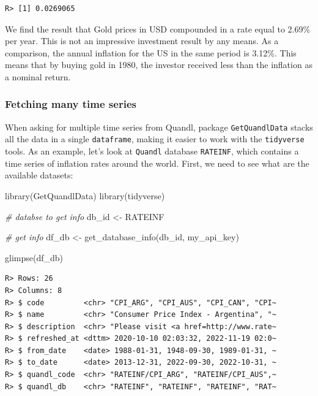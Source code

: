 \documentclass[
  12pt,
]{book}
\newenvironment{Shaded}{\begin{snugshade}}{\end{snugshade}}
\newcommand{\CommentTok}[1]{\textcolor[rgb]{0.37,0.37,0.37}{\textit{#1}}}
\newcommand{\FunctionTok}[1]{\textcolor[rgb]{0,0,0}{#1}}
\newcommand{\NormalTok}[1]{#1}
\newcommand{\OtherTok}[1]{\textcolor[rgb]{0.37,0.37,0.37}{#1}}
\newcommand{\StringTok}[1]{\textcolor[rgb]{0.5,0.5,0.5}{#1}}
\begin{document}
\begin{verbatim}
R> [1] 0.0269065
\end{verbatim}

We find the result that Gold prices in USD compounded in a rate equal to 2.69\% per year. This is not an impressive investment result by any means. As a comparison, the annual inflation for the US in the same period is 3.12\%. This means that by buying gold in 1980, the investor received less than the inflation as a nominal return.

\hypertarget{fetching-many-time-series}{%
\subsubsection{Fetching many time series}\label{fetching-many-time-series}}

When asking for multiple time series from Quandl, package \texttt{GetQuandlData} stacks all the data in a single \texttt{dataframe}, making it easier to work with the \texttt{tidyverse} tools. As an example, let's look at \texttt{Quandl} database \texttt{RATEINF}, which contains a time series of inflation rates around the world. First, we need to see what are the available datasets:

\begin{Shaded}
\begin{Highlighting}[]
\FunctionTok{library}\NormalTok{(GetQuandlData)}
\FunctionTok{library}\NormalTok{(tidyverse)}

\CommentTok{\# databse to get info}
\NormalTok{db\_id }\OtherTok{\textless{}{-}} \StringTok{\textquotesingle{}RATEINF\textquotesingle{}}

\CommentTok{\# get info }
\NormalTok{df\_db }\OtherTok{\textless{}{-}} \FunctionTok{get\_database\_info}\NormalTok{(db\_id, my\_api\_key)}

\FunctionTok{glimpse}\NormalTok{(df\_db)}
\end{Highlighting}
\end{Shaded}

\begin{verbatim}
R> Rows: 26
R> Columns: 8
R> $ code         <chr> "CPI_ARG", "CPI_AUS", "CPI_CAN", "CPI~
R> $ name         <chr> "Consumer Price Index - Argentina", "~
R> $ description  <chr> "Please visit <a href=http://www.rate~
R> $ refreshed_at <dttm> 2020-10-10 02:03:32, 2022-11-19 02:0~
R> $ from_date    <date> 1988-01-31, 1948-09-30, 1989-01-31, ~
R> $ to_date      <date> 2013-12-31, 2022-09-30, 2022-10-31, ~
R> $ quandl_code  <chr> "RATEINF/CPI_ARG", "RATEINF/CPI_AUS",~
R> $ quandl_db    <chr> "RATEINF", "RATEINF", "RATEINF", "RAT~
\end{verbatim}
\end{document}
